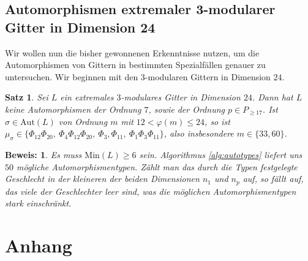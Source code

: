 \documentclass[12pt,a4paper,halfparskip,headsepline,bibtotocnumbered]{scrreprt}
\theoremstyle{nummermitklammern}
\newtheorem{satz}[defsatzusw]{Satz}
\theoremstyle{nonumberbreak}
\newtheorem{beweis}{Beweis:}
\newcommand{\Min}{\text{Min}}
\newcommand{\Aut}{\text{Aut}}
\begin{document}
\section{Automorphismen extremaler 3-modularer Gitter in Dimension 24}

Wir wollen nun die bisher gewonnenen Erkenntnisse nutzen, um die Automorphismen von Gittern in bestimmten Spezialfällen genauer zu untersuchen. Wir beginnen mit den $3$-modularen Gittern in Dimension $24$.
\begin{framed}
	\begin{satz}
		Sei $L$ ein extremales $3$-modulares Gitter in Dimension $24$. Dann hat $L$ keine Automorphismen der Ordnung $7$, sowie der Ordnung $p \in P_{\ge 17}$. Ist $\sigma \in \Aut(L)$ von Ordnung $m$ mit $12 < \varphi(m) \leq 24$, so ist $\mu_\sigma \in \lbrace \Phi_{12} \Phi_{20},\ \Phi_4 \Phi_{12} \Phi_{20},\ \Phi_3, \Phi_{11},\ \Phi_1 \Phi_3 \Phi_{11} \rbrace$, also insbesondere $m \in \lbrace 33, 60 \rbrace$.
	\end{satz}
\end{framed}

\begin{beweis}
	Es muss $\Min(L) \ge 6$ sein. Algorithmus \eqref{alg:autotypes} liefert uns $50$ mögliche Automorphismentypen. Zählt man das durch die Typen festgelegte Geschlecht in der kleineren der beiden Dimensionen $n_1$ und $n_p$ auf, so fällt auf, das viele der Geschlechter leer sind, was die möglichen Automorphismentypen stark einschränkt.
\end{beweis}


\chapter{Anhang}
\end{document}

